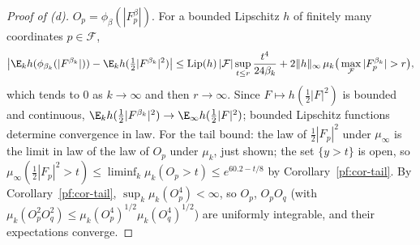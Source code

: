 \begin{proof}[Proof of (d)]
$O_p=\phi_{\beta}(|F^\beta_p|)$. For a bounded Lipschitz $h$ of finitely many coordinates $p\in\mathcal F$,
\[
\big|\E_kh(\phi_{\beta_k}(|F^{\beta_k}|))-\E_kh(\tfrac12|F^{\beta_k}|^2)\big|\le\mathrm{Lip}(h)\,|\mathcal F|\sup_{t\le r}\frac{t^4}{24\beta_k}+2\|h\|_\infty\,\mu_k\big(\max_{\mathcal F}|F^{\beta_k}_p|>r\big),
\]
which tends to $0$ as $k\to\infty$ and then $r\to\infty$. Since $F\mapsto h(\tfrac12|F|^2)$ is bounded and continuous, $\E_kh(\tfrac12|F^{\beta_k}|^2)\to\E_\infty h(\tfrac12|F|^2)$; bounded Lipschitz functions determine convergence in law. For the tail bound: the law of $\tfrac12|F_p|^2$ under $\mu_\infty$ is the limit in law of the law of $O_p$ under $\mu_k$, just shown; the set $\{y>t\}$ is open, so $\mu_\infty(\tfrac12|F_p|^2>t)\le\liminf_k\mu_k(O_p>t)\le e^{60.2-t/8}$ by Corollary~\ref{pf:cor-tail}. By Corollary~\ref{pf:cor-tail}, $\sup_k\mu_k(O_p^4)<\infty$, so $O_p$, $O_pO_q$ (with $\mu_k(O_p^2O_q^2)\le\mu_k(O_p^4)^{1/2}\mu_k(O_q^4)^{1/2}$) are uniformly integrable, and their expectations converge.
\end{proof}

